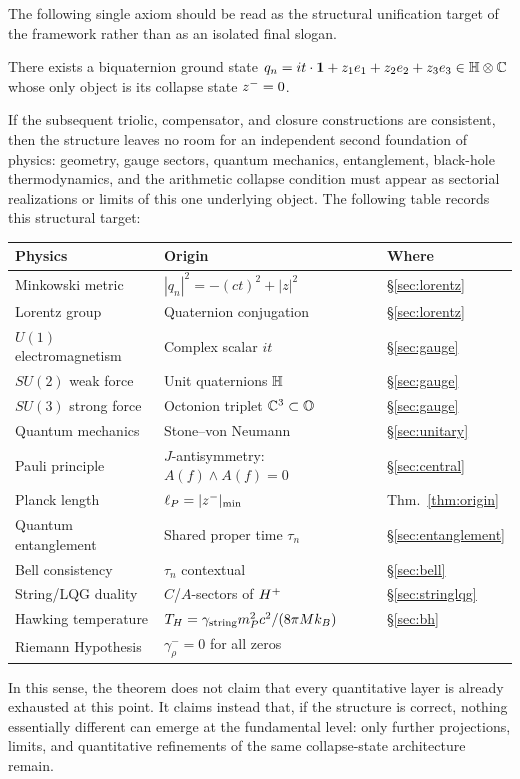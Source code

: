 \begin{theorem}\label{thm:toe}
The following single axiom should be read as the structural unification
 target of the framework rather than as an isolated final slogan.
\begin{axiom}
There exists a biquaternion ground state
$q_n = it\cdot\mathbf{1}+z_1 e_1+z_2 e_2+z_3 e_3\in\mathbb{H}\otimes\mathbb{C}$
whose only object is its collapse state $z^-=0$.
\end{axiom}
If the subsequent triolic, compensator, and closure constructions are
consistent, then the structure leaves no room for an independent second
foundation of physics: geometry, gauge sectors, quantum mechanics,
entanglement, black-hole thermodynamics, and the arithmetic collapse
condition must appear as sectorial realizations or limits of this one
underlying object. The following table records this structural target:
\begin{center}
\renewcommand{\arraystretch}{1.2}
\begin{tabular}{lll}
\toprule
Physics & Origin & Where\\
\midrule
Minkowski metric & $|q_n|^2=-(ct)^2+|z|^2$ & \S\ref{sec:lorentz}\\
Lorentz group & Quaternion conjugation & \S\ref{sec:lorentz}\\
$U(1)$ electromagnetism & Complex scalar $it$ & \S\ref{sec:gauge}\\
$SU(2)$ weak force & Unit quaternions $\mathbb{H}$ & \S\ref{sec:gauge}\\
$SU(3)$ strong force & Octonion triplet $\mathbb{C}^3\subset\mathbb{O}$ & \S\ref{sec:gauge}\\
Quantum mechanics & Stone--von Neumann & \S\ref{sec:unitary}\\
Pauli principle & $J$-antisymmetry: $A(f)\wedge A(f)=0$ & \S\ref{sec:central}\\
Planck length & $\ell_P=|z^-|_{\min}$ & Thm.~\ref{thm:origin}\\
Quantum entanglement & Shared proper time $\tau_n$ & \S\ref{sec:entanglement}\\
Bell consistency & $\tau_n$ contextual & \S\ref{sec:bell}\\
String/LQG duality & $C$/$A$-sectors of $H^+$ & \S\ref{sec:stringlqg}\\
Hawking temperature & $T_H=\gamma_{\mathrm{string}} m_P^2 c^2/(8\pi M k_B)$ & \S\ref{sec:bh}\\
Riemann Hypothesis & $\gamma^-_\rho=0$ for all zeros & \cite{brendecke2026rh}\\
\bottomrule
\end{tabular}
\end{center}
In this sense, the theorem does not claim that every quantitative layer is
already exhausted at this point. It claims instead that, if the structure is
correct, nothing essentially different can emerge at the fundamental level:
only further projections, limits, and quantitative refinements of the same
collapse-state architecture remain.
\end{theorem}


